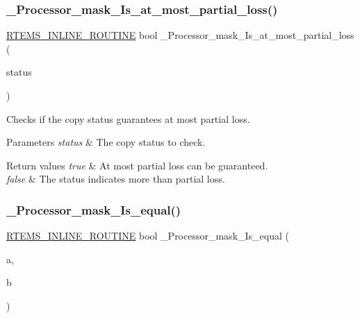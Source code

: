 \subsubsection{\texorpdfstring{\_Processor\_mask\_Is\_at\_most\_partial\_loss()}{\_Processor\_mask\_Is\_at\_most\_partial\_loss()}}
{\footnotesize\ttfamily \mbox{\hyperlink{group__RTEMSScoreBaseDefs_gac216239df231d5dbd15e3520b0b9313f}{R\+T\+E\+M\+S\+\_\+\+I\+N\+L\+I\+N\+E\+\_\+\+R\+O\+U\+T\+I\+NE}} bool \+\_\+\+Processor\+\_\+mask\+\_\+\+Is\+\_\+at\+\_\+most\+\_\+partial\+\_\+loss (\begin{DoxyParamCaption}\item[{Processor\+\_\+mask\+\_\+\+Copy\+\_\+status}]{status }\end{DoxyParamCaption})}



Checks if the copy status guarantees at most partial loss. 


\begin{DoxyParams}{Parameters}
{\em status} & The copy status to check.\\
\hline
\end{DoxyParams}

\begin{DoxyRetVals}{Return values}
{\em true} & At most partial loss can be guaranteed. \\
\hline
{\em false} & The status indicates more than partial loss. \\
\hline
\end{DoxyRetVals}
\mbox{\label{group__RTEMSScoreProcessorMask_ga841c9df751a70cf2ee8a9f4842d259ff}} 
\subsubsection{\texorpdfstring{\_Processor\_mask\_Is\_equal()}{\_Processor\_mask\_Is\_equal()}}
{\footnotesize\ttfamily \mbox{\hyperlink{group__RTEMSScoreBaseDefs_gac216239df231d5dbd15e3520b0b9313f}{R\+T\+E\+M\+S\+\_\+\+I\+N\+L\+I\+N\+E\+\_\+\+R\+O\+U\+T\+I\+NE}} bool \+\_\+\+Processor\+\_\+mask\+\_\+\+Is\+\_\+equal (\begin{DoxyParamCaption}\item[{const Processor\+\_\+mask $\ast$}]{a,  }\item[{const Processor\+\_\+mask $\ast$}]{b }\end{DoxyParamCaption})}



